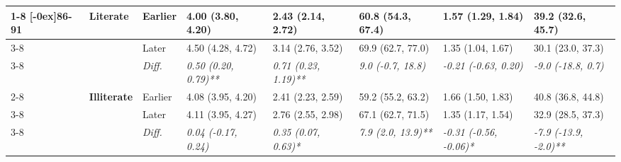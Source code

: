 \documentclass[12pt, a4paper]{article}
\begin{document}
\begin{appendices}
\begin{table}[!p]
{\begin{tabular}[t]{>{}l>{}lllllll}
        \cmidrule{1-8}
        \multirow{9}{*}[-0ex]{\textbf{86-91}} & \multirow{3}{*}{\textbf{Literate}}   & Earlier                       & 4.00 (3.80, 4.20)                           & 2.43 (2.14, 2.72)                           & 60.8 (54.3, 67.4)                           & 1.57 (1.29, 1.84)                               & 39.2 (32.6, 45.7)                              \\
        \cmidrule{3-8}
                                              &                                      & Later                         & 4.50 (4.28, 4.72)                           & 3.14 (2.76, 3.52)                           & 69.9 (62.7, 77.0)                           & 1.35 (1.04, 1.67)                               & 30.1 (23.0, 37.3)                              \\
        \cmidrule{3-8}
                                              &                                      & \cellcolor{gray!10}\em{Diff.} & \cellcolor{gray!10}\em{0.50 (0.20, 0.79)**} & \cellcolor{gray!10}\em{0.71 (0.23, 1.19)**} & \cellcolor{gray!10}\em{9.0 (-0.7, 18.8)}    & \cellcolor{gray!10}\em{-0.21 (-0.63, 0.20)}     & \cellcolor{gray!10}\em{-9.0 (-18.8, 0.7)}      \\
        \cmidrule{2-8}
                                              & \multirow{3}{*}{\textbf{Illiterate}} & Earlier                       & 4.08 (3.95, 4.20)                           & 2.41 (2.23, 2.59)                           & 59.2 (55.2, 63.2)                           & 1.66 (1.50, 1.83)                               & 40.8 (36.8, 44.8)                              \\
        \cmidrule{3-8}
                                              &                                      & Later                         & 4.11 (3.95, 4.27)                           & 2.76 (2.55, 2.98)                           & 67.1 (62.7, 71.5)                           & 1.35 (1.17, 1.54)                               & 32.9 (28.5, 37.3)                              \\
        \cmidrule{3-8}
                                              &                                      & \cellcolor{gray!10}\em{Diff.} & \cellcolor{gray!10}\em{0.04 (-0.17, 0.24)}  & \cellcolor{gray!10}\em{0.35 (0.07, 0.63)*}  & \cellcolor{gray!10}\em{7.9 (2.0, 13.9)**}   & \cellcolor{gray!10}\em{-0.31 (-0.56, -0.06)*}   & \cellcolor{gray!10}\em{-7.9 (-13.9, -2.0)**}   \\
        \bottomrule
      \end{tabular}}
  \end{table}
  \vspace*{\fill}


\end{appendices}
\end{document}
